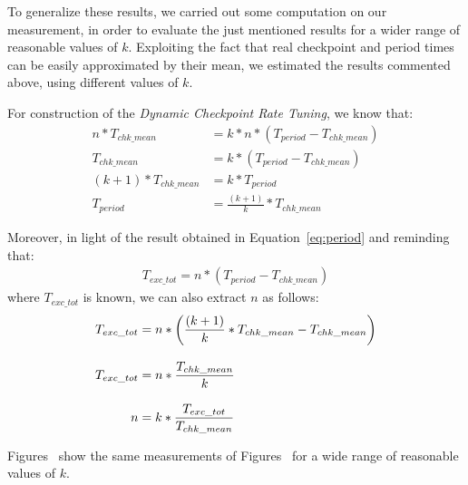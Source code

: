 To generalize these results, we carried out some computation on our measurement, in order to evaluate the just mentioned results for a wider range of reasonable values of $k$. Exploiting the fact that real checkpoint and period times can be easily approximated by their mean, we estimated the results commented above, using different values of $k$. 

For construction of the \emph{Dynamic Checkpoint Rate Tuning}, we know that:
\begin{align}
    n*T_{chk\_mean} &= k*n*(T_{period} - T_{chk\_mean})\label{eq:extract}\\
    T_{chk\_mean} &= k*(T_{period} - T_{chk\_mean})\\
    (k+1)*T_{chk\_mean} &= k*T_{period}\\
    T_{period} &= \frac{(k+1)}{k}*T_{chk\_mean}\label{eq:period}
\end{align}

Moreover, in light of the result obtained in Equation~\ref{eq:period} and reminding that:
\begin{align}
    T_{exc\_tot} = n*(T_{period} - T_{chk\_mean})
\end{align}
where $T_{exc\_tot}$ is known, we can also extract $n$ as follows:
\begin{align}
    T_{exc\_tot} &= n*\left(\frac{(k+1)}{k}*T_{chk\_mean} - T_{chk\_mean}\right)\\
    \noalign{\vskip9pt}
    T_{exc\_tot} &= n * \frac{T_{chk\_mean}}{k}\\
    \noalign{\vskip9pt}
    n &= k * \frac{T_{exc\_tot}}{T_{chk\_mean}}
\end{align}

Figures~ show the same measurements of Figures~ for a wide range of reasonable values of $k$.

